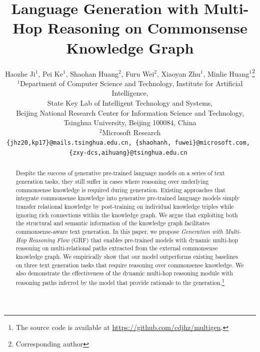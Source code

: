 \documentclass[11pt,a4paper]{article}
\title{Language Generation with Multi-Hop Reasoning on Commonsense Knowledge Graph}
\author{Haozhe Ji$^1$, Pei Ke$^1$, Shaohan Huang$^2$, Furu Wei$^2$, Xiaoyan Zhu$^1$, Minlie Huang$^1$\thanks{\quad Corresponding author}  \\
$^1$Department of Computer Science and Technology,
Institute for Artificial Intelligence, \\
State Key Lab of Intelligent Technology and Systems, \\ 
Beijing National Research Center for Information Science and Technology, \\ 
Tsinghua University, Beijing 100084, China \\
$^2$Microsoft Research \\
  {\tt\small \{jhz20,kp17\}@mails.tsinghua.edu.cn, \{shaohanh, fuwei\}@microsoft.com, } \\
  {\tt\small \{zxy-dcs,aihuang\}@tsinghua.edu.cn } \\}
\date{}
\begin{document}
\maketitle
\begin{abstract}
Despite the success of generative pre-trained language models on a series of text generation tasks, they still suffer in cases where reasoning over underlying commonsense knowledge is required during generation.
Existing approaches that integrate commonsense knowledge into generative pre-trained language models simply transfer relational knowledge by post-training on individual knowledge triples while ignoring rich connections within the knowledge graph. We argue that exploiting both the structural and semantic information of the knowledge graph facilitates commonsense-aware text generation. In this paper, we propose \textit{Generation with Multi-Hop Reasoning Flow} (GRF) that enables pre-trained models with dynamic multi-hop reasoning on multi-relational paths extracted from the external commonsense knowledge graph. We empirically show that our model outperforms existing baselines on three text generation tasks that require reasoning over commonsense knowledge. We also demonstrate the effectiveness of the dynamic multi-hop reasoning module with reasoning paths inferred by the model that provide rationale to the generation.\footnote{The source code is available at \url{https://github.com/cdjhz/multigen}.}
\end{abstract}
\end{document}

